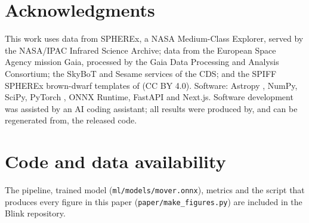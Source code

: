 \documentclass[10pt,twocolumn]{article}
\begin{document}
\section*{Acknowledgments}
This work uses data from SPHEREx, a NASA Medium-Class Explorer, served by the NASA/IPAC Infrared Science
Archive; data from the European Space Agency mission Gaia, processed by the Gaia Data Processing and
Analysis Consortium; the SkyBoT and Sesame services of the CDS; and the SPIFF SPHEREx brown-dwarf templates
of \citet{gagne2026} (CC BY 4.0). Software: Astropy \citep{astropy2022}, NumPy, SciPy, PyTorch
\citep{paszke2019}, ONNX Runtime, FastAPI and Next.js. Software development was assisted by an AI coding
assistant; all results were produced by, and can be regenerated from, the released code.

\section*{Code and data availability}
The pipeline, trained model (\texttt{ml/models/mover.onnx}), metrics and the script that produces every
figure in this paper (\texttt{paper/make\_figures.py}) are included in the Blink repository.
\end{document}
